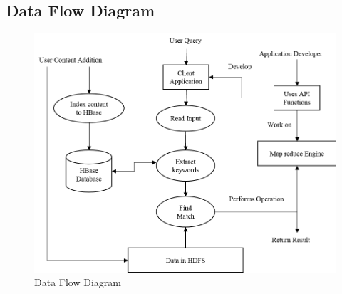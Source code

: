 \documentclass[oneside,a4paper,12pt]{report}
\begin{document}
\subsection{Data Flow Diagram}
\begin{figure}[H]
\includegraphics{data_flow}
\caption{Data Flow Diagram}
\end{figure}
\end{document}
